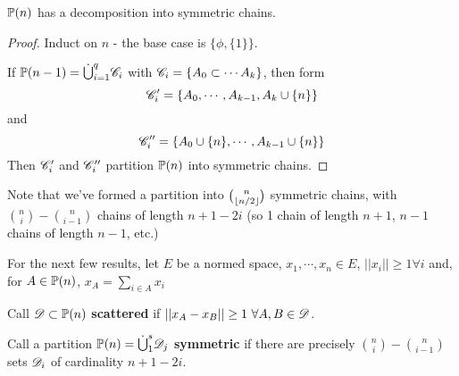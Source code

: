 \documentclass[a4paper]{article}
\begin{document}
\begin{thm-num}
	$\P(n)$ has a decomposition into symmetric chains.
\end{thm-num}
\begin{proof}
	Induct on $n$ - the base case is $\{\phi,\{1\}\}$.
	
	If $\P(n-1)=\dot{\bigcup}_{i=1}^{q}\calC_i$ with $\calC_i = \left\{A_0\subset\cdots A_k\right\}$, then form $$\calC_i'=\left\{A_0,\cdots,A_{k-1},A_k\cup\{n\}\right\}$$
	and $$\calC_i''=\left\{A_0\cup\{n\},\cdots,A_{k-1}\cup\{n\}\right\}$$
	Then $\calC_i'$ and $\calC_i''$ partition $\P(n)$ into symmetric chains.
\end{proof}
\begin{rem}
	Note that we've formed a partition into $\binom{n}{\lf n/2\rf}$ symmetric chains, with $\binom{n}{i}-\binom{n}{i-1}$ chains of length $n+1-2i$ (so 1 chain of length $n+1$, $n-1$ chains of length $n-1$, etc.)
\end{rem}

For the next few results, let $E$ be a normed space, $x_1,\cdots, x_n\in E$, $\left|\left|x_i\right|\right|\geq 1\forall i$ and, for $A\in\P(n)$, $x_A=\sum_{i\in A}x_i$

\begin{defi}[Scattered]
	Call $\calD\subset\P(n)$ \textbf{scattered} if $\left|\left|x_A - x_B\right|\right|\geq1\ \forall A, B\in \calD$.
\end{defi}

\begin{defi}
	Call a partition $\P(n)=\dot{\bigcup}_1^s\calD_j$ \textbf{symmetric} if there are precisely $\binom{n}{i}-\binom{n}{i-1}$ sets $\calD_i$ of cardinality $n+1-2i$.
\end{defi}
\end{document}
